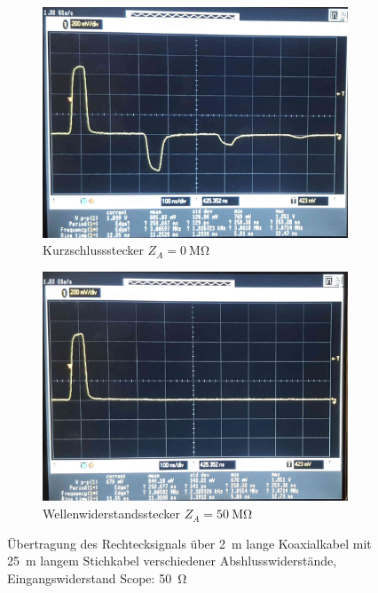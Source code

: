 \documentclass[a4paper,twoside,final]{article}
\begin{document}
\begin{figure}[htp]
    \centering
    \begin{subfigure}{0.45\textwidth}
        \includegraphics[width=\textwidth]{Bilder/Bild5.jpg}
        \caption{Kurzschlussstecker $Z_A = \SI{0}{\mega\ohm}$}
    \end{subfigure}\hspace{1cm}
    \begin{subfigure}{0.45\textwidth}
        \includegraphics[width=\textwidth]{Bilder/Bild6.jpg}
        \caption{Wellenwiderstandsstecker $Z_A = \SI{50}{\mega\ohm}$}
    \end{subfigure}
    \caption{Übertragung des Rechtecksignals über \SI{2}{\metre} lange Koaxialkabel mit \SI{25}{\metre} langem Stichkabel verschiedener Abshlusswiderstände, Eingangswiderstand Scope: \SI{50}{\ohm}}
    \label{fig:Stichkabel_Kurzschluss_Wellenwiderstand}
\end{figure}\\
\end{document}
